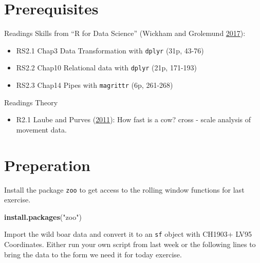 \documentclass[]{book}
\newenvironment{Shaded}{\begin{snugshade}}{\end{snugshade}}
\newcommand{\KeywordTok}[1]{\textcolor[rgb]{0.13,0.29,0.53}{\textbf{#1}}}
\newcommand{\NormalTok}[1]{#1}
\newcommand{\StringTok}[1]{\textcolor[rgb]{0.31,0.60,0.02}{#1}}
\providecommand{\tightlist}{%
  \setlength{\itemsep}{0pt}\setlength{\parskip}{0pt}}
\begin{document}
\hypertarget{prerequisites-1}{%
\section{Prerequisites}\label{prerequisites-1}}

Readings Skills from ``R for Data Science'' (Wickham and Grolemund \protect\hyperlink{ref-wickham2017}{2017}):

\begin{itemize}
\tightlist
\item
  RS2.1 Chap3 Data Transformation with \texttt{dplyr} (31p, 43-76)
\item
  RS2.2 Chap10 Relational data with \texttt{dplyr} (21p, 171-193)
\item
  RS2.3 Chap14 Pipes with \texttt{magrittr} (6p, 261-268)
\end{itemize}

Readings Theory

\begin{itemize}
\tightlist
\item
  R2.1 Laube and Purves (\protect\hyperlink{ref-laube2011}{2011}): How fast is a cow? cross - scale analysis of movement data.
\end{itemize}

\hypertarget{preperation-1}{%
\section{Preperation}\label{preperation-1}}

Install the package \texttt{zoo} to get access to the rolling window functions for last exercise.

\begin{Shaded}
\begin{Highlighting}[]
\KeywordTok{install.packages}\NormalTok{(}\StringTok{"zoo"}\NormalTok{)}
\end{Highlighting}
\end{Shaded}

Import the wild boar data and convert it to an \texttt{sf} object with CH1903+ LV95 Coordinates. Either run your own script from last week or the following lines to bring the data to the form we need it for today exercise.
\end{document}
